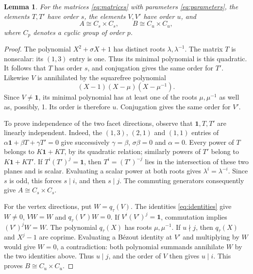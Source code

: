 \documentclass[11pt]{article}
\newtheorem{lemma}[theorem]{Lemma}
\theoremstyle{definition}
\begin{document}
\begin{lemma}\label{lem:translations}
For the matrices \eqref{eq:matrices} with parameters
\eqref{eq:parameters}, the elements $T,T'$ have order $s$, the elements
$V,V'$ have order $u$, and
\[
                       A\cong C_s\times C_s,\qquad
                       B\cong C_u\times C_u,
\]
where $C_p$ denotes a cyclic group of order $p$.
\end{lemma}
\begin{proof}
The polynomial $X^2+\sigma X+1$ has distinct roots
$\lambda,\lambda^{-1}$. The matrix $T$ is nonscalar: its $(1,3)$ entry
is one. Thus its minimal polynomial is this quadratic. It follows that
$T$ has order $s$, and conjugation gives the same order for $T'$.
Likewise $V$ is annihilated by the squarefree polynomial
\[
             (X-1)(X-\mu)(X-\mu^{-1}).
\]
Since $V\ne \mathbf 1$, its minimal polynomial has at least one of the roots
$\mu,\mu^{-1}$ as well as, possibly, 1. Its order is therefore $u$.
Conjugation gives the same order for $V'$.

To prove independence of the two facet directions, observe that
$\mathbf 1,T,T'$ are linearly independent. Indeed, the $(1,3)$, $(2,1)$ and
$(1,1)$ entries of $\alpha \mathbf 1+\beta T+\gamma T'=0$ give successively
$\gamma=\beta$, $\sigma\beta=0$ and $\alpha=0$.
Every power of $T$ belongs to $K\mathbf 1+KT$, by its quadratic relation;
similarly powers of $T'$ belong to $K\mathbf 1+KT'$.
If $T^i(T')^j=\mathbf 1$, then $T^i=(T')^{-j}$ lies in the intersection of
these two planes and is scalar. Evaluating a scalar power at both
roots gives $\lambda^i=\lambda^{-i}$. Since $s$ is odd, this forces
$s\mid i$, and then $s\mid j$. The commuting generators consequently
give $A\cong C_s\times C_s$.

For the vertex directions, put $W=q_\tau(V)$. The identities
\eqref{eq:identities} give $W\ne0$, $VW=W$ and $q_\tau(V')W=0$.
If $V^i(V')^j=\mathbf 1$, commutation implies $(V')^jW=W$.
The polynomial $q_\tau(X)$ has roots $\mu,\mu^{-1}$. If $u\nmid j$,
then $q_\tau(X)$ and $X^j-1$ are coprime. Evaluating a Bézout identity
at $V'$ and multiplying by $W$ would give $W=0$, a contradiction:
both polynomial summands annihilate $W$ by the two identities above.
Thus $u\mid j$, and the order of $V$ then gives $u\mid i$.
This proves $B\cong C_u\times C_u$.
\end{proof}
\end{document}

